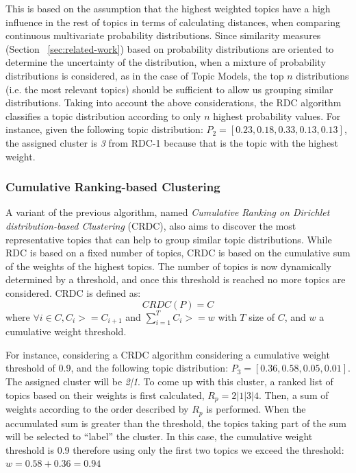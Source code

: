 This is based on the assumption that the highest weighted topics have a high influence in the rest of topics in terms of calculating distances, when comparing continuous multivariate probability distributions. Since similarity measures (Section ~\ref{sec:related-work}) based on probability distributions are oriented to determine the uncertainty of the distribution, when a mixture of probability distributions is considered, as in the case of Topic Models, the top $n$ distributions (i.e. the most relevant topics) should be sufficient to allow us grouping similar distributions. Taking into account the above considerations, the RDC algorithm classifies a topic distribution according to only $n$ highest probability values. For instance, given the following topic distribution: $P_2=[0.23, 0.18, 0.33, 0.13, 0.13]$, the assigned cluster is \textit{3} from RDC-1 because that is the topic with the highest weight.

\subsubsection{Cumulative Ranking-based Clustering}

A variant of the previous algorithm, named \textit{Cumulative Ranking on Dirichlet distribution-based Clustering} (CRDC), also aims to discover the most representative topics that can help to group similar topic distributions. While RDC is based on a fixed number of topics, CRDC is based on the cumulative sum of the weights of the highest topics. The number of topics is now dynamically determined by a threshold, and once this threshold is reached no more topics are considered. CRDC is defined as:
\begin{equation}
CRDC(P)=C
\end{equation}
where  $\forall i \in C, C_i >=C_{i+1}$ and $\sum\limits_{i=1}^T C_i >= w$ with $T$ size of $C$, and $w$ a cumulative weight threshold.


For instance, considering a CRDC algorithm considering a cumulative weight threshold of 0.9, and the following topic distribution: $P_3=[0.36, 0.58, 0.05, 0.01]$. The assigned cluster will be \textit{2|1}. To come up with this cluster, a ranked list of topics based on their weights is first calculated, $R_p=2|1|3|4$. Then, a sum of weights according to the order described by $R_p$ is performed. When the accumulated sum is greater than the threshold, the topics taking part of the sum will be selected to ``label'' the cluster. In this case, the cumulative weight threshold is 0.9 therefore using only the first two topics we exceed the threshold: $w=0.58+0.36=0.94$


